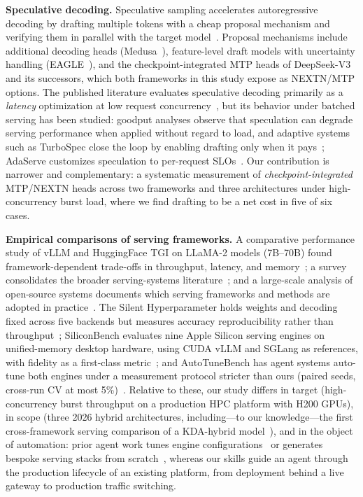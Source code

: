 \documentclass[11pt]{article}
\begin{document}
\textbf{Speculative decoding.} Speculative sampling accelerates autoregressive decoding by drafting multiple tokens with a cheap proposal mechanism and verifying them in parallel with the target model~\cite{leviathan2023spec}. Proposal mechanisms include additional decoding heads (Medusa~\cite{cai2024medusa}), feature-level draft models with uncertainty handling (EAGLE~\cite{li2024eagle}), and the checkpoint-integrated MTP heads of DeepSeek-V3~\cite{deepseek2024v3} and its successors, which both frameworks in this study expose as NEXTN/MTP options. The published literature evaluates speculative decoding primarily as a \emph{latency} optimization at low request concurrency~\cite{leviathan2023spec,li2024eagle,cai2024medusa}, but its behavior under batched serving has been studied: goodput analyses observe that speculation can degrade serving performance when applied without regard to load, and adaptive systems such as TurboSpec close the loop by enabling drafting only when it pays~\cite{liu2024turbospec}; AdaServe customizes speculation to per-request SLOs~\cite{li2025adaserve}. Our contribution is narrower and complementary: a systematic measurement of \emph{checkpoint-integrated} MTP/NEXTN heads across two frameworks and three architectures under high-concurrency burst load, where we find drafting to be a net cost in five of six cases.

\textbf{Empirical comparisons of serving frameworks.} A comparative performance study of vLLM and HuggingFace TGI on LLaMA-2 models (7B--70B) found framework-dependent trade-offs in throughput, latency, and memory~\cite{kolluru2025tgi}; a survey consolidates the broader serving-systems literature~\cite{li2024survey}; and a large-scale analysis of open-source systems documents which serving frameworks and methods are adopted in practice~\cite{majidi2026wild}. The Silent Hyperparameter holds weights and decoding fixed across five backends but measures accuracy reproducibility rather than throughput~\cite{pape2026silent}; SiliconBench evaluates nine Apple Silicon serving engines on unified-memory desktop hardware, using CUDA vLLM and SGLang as references, with fidelity as a first-class metric~\cite{zhang2026siliconbench}; and AutoTuneBench has agent systems auto-tune both engines under a measurement protocol stricter than ours (paired seeds, cross-run CV at most 5\%)~\cite{chen2026autotunebench}. Relative to these, our study differs in target (high-concurrency burst throughput on a production HPC platform with H200 GPUs), in scope (three 2026 hybrid architectures, including---to our knowledge---the first cross-framework serving comparison of a KDA-hybrid model~\cite{kimi2025linear}), and in the object of automation: prior agent work tunes engine configurations~\cite{chen2026autotunebench} or generates bespoke serving stacks from scratch~\cite{kamahori2026vibeserve}, whereas our skills guide an agent through the production lifecycle of an existing platform, from deployment behind a live gateway to production traffic switching.
\end{document}
